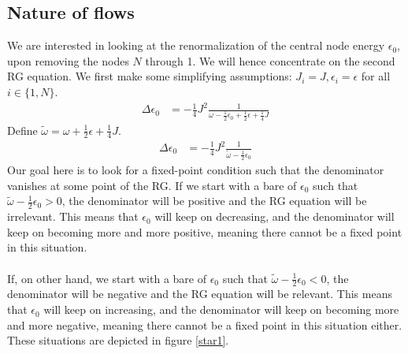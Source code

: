 \documentclass[twoside,11pt]{report}
\numberwithin{equation}{section}
\begin{document}
\subsection{Nature of flows}
We are interested in looking at the renormalization of the central node energy \(\epsilon_0\), upon removing the nodes \(N\) through 1. We will hence concentrate on the second RG equation. We first make some simplifying assumptions: \(J_i = J, \epsilon_i = \epsilon\) for all \(i\in\{1,N\}\).
\begin{equation}\begin{aligned}
	\label{stareq}
	\Delta \epsilon_0 &= -\frac{1}{4}J^2 \frac{1}{\omega - \frac{1}{2}\epsilon_0 + \frac{1}{2}\epsilon + \frac{1}{4}J}
\end{aligned}\end{equation}
Define \(\tilde\omega = \omega + \frac{1}{2}\epsilon + \frac{1}{4}J\).
\begin{equation}\begin{aligned}
	\Delta \epsilon_0 &= -\frac{1}{4}J^2 \frac{1}{\tilde \omega - \frac{1}{2}\epsilon_0}
\end{aligned}\end{equation}
Our goal here is to look for a fixed-point condition such that the denominator vanishes at some point of the RG. If we start with a bare of \(\epsilon_0\) such that \(\tilde \omega - \frac{1}{2}\epsilon_0 > 0\), the denominator will be positive and the RG equation will be irrelevant. This means that \(\epsilon_0\) will keep on decreasing, and the denominator will keep on becoming more and more positive, meaning there cannot be a fixed point in this situation.
\\\\If, on other hand, we start with a bare of \(\epsilon_0\) such that \(\tilde \omega - \frac{1}{2}\epsilon_0 < 0\), the denominator will be negative and the RG equation will be relevant. This means that \(\epsilon_0\) will keep on increasing, and the denominator will keep on becoming more and more negative, meaning there cannot be a fixed point in this situation either. These situations are depicted in figure \ref{star1}.
\end{document}
